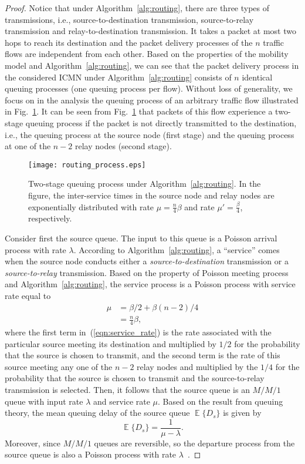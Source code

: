 \documentclass[twocolumn, 10pt]{svjour3}         \smartqed  \usepackage{graphicx}
\DeclareMathOperator*{\E}{\mathbb{E}}
\begin{document}
\begin{proof}
Notice that under Algorithm~\ref{alg:routing}, there are three types of transmissions, i.e., source-to-destination transmission, source-to-relay transmission and relay-to-destination transmission.
It takes a packet at most two hops to reach its destination and the packet delivery processes of the $n$ traffic flows are independent from each other.
Based on the properties of the mobility model and Algorithm~\ref{alg:routing}, we can see that the packet delivery process in the considered ICMN under Algorithm~\ref{alg:routing} consists of $n$ identical queuing processes (one queuing process per flow). 
Without loss of generality, we focus on in the analysis the queuing process of an arbitrary traffic flow illustrated in Fig.~\ref{fig:routing_process}.
It can be seen from Fig.~\ref{fig:routing_process} that packets  of this flow experience a  two-stage queuing process if the packet is not directly transmitted to the destination, i.e., the queuing process at the source node (first stage) and the queuing process at one of the $n-2$ relay nodes (second stage).

\begin{figure}[!t]
	\centering
		\texttt{[image: routing\_process.eps]}
	\caption{Two-stage queuing process under Algorithm~\ref{alg:routing}. In the figure, the inter-service times in the source node and relay nodes are exponentially distributed with rate $\mu = \frac{n}{4}\beta$ and rate $\mu' = \frac{\beta}{4}$, respectively.}
	\label{fig:routing_process}
\end{figure}

Consider first the source queue.
The input to this queue is a Poisson arrival process with rate $\lambda$.
According to Algorithm~\ref{alg:routing}, a ``service'' comes  when  the source node conducts either a \emph{source-to-destination} transmission or a  \emph{source-to-relay} transmission.
Based on the property of Poisson meeting process and Algorithm~\ref{alg:routing}, the service process is a Poisson process with service rate equal to
\begin{align}
\mu &= \beta /2 + \beta (n-2) /4 \label{eqn:service_rate}\\
	&= \frac{n}{4}\beta,
\end{align}
where the first term in~(\ref{eqn:service_rate}) is the rate associated with the particular source meeting its destination and multiplied by $1/2$ for the probability that the source is chosen to transmit,  and the second term is the rate of this source meeting any one of the $n-2$ relay nodes and  multiplied by the $1/4$ for the probability that the source is chosen to transmit and the source-to-relay transmission is selected.
Then, it follows that the source queue is an $M/M/1$ queue with input rate $\lambda$ and service rate $\mu$.
Based on the result from queuing theory, the mean queuing delay of the source queue  $\E\{D_s\}$ is given by
\begin{equation}
	\E\{D_s\} = \frac{1}{\mu-\lambda}.
\end{equation}
Moreover, since $M/M/1$ queues are reversible, so the departure process from the source queue is also a Poisson process with rate $\lambda$~\cite{kelly2011reversibility}.


\end{proof}
\end{document}
